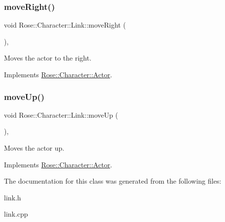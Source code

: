 \mbox{\label{classRose_1_1Character_1_1Link_ad93043b13d83e8afb6f33c3c2572b05b}} 
\subsubsection{\texorpdfstring{moveRight()}{moveRight()}}
{\footnotesize\ttfamily void Rose\+::\+Character\+::\+Link\+::move\+Right (\begin{DoxyParamCaption}{ }\end{DoxyParamCaption})\hspace{0.3cm}{\ttfamily [override]}, {\ttfamily [virtual]}}



Moves the actor to the right. 



Implements \mbox{\hyperlink{classRose_1_1Character_1_1Actor_a89ce0e5d1d6d25b1612867b982221dc9}{Rose\+::\+Character\+::\+Actor}}.

\mbox{\label{classRose_1_1Character_1_1Link_a74ccaa0d2cf7af5b1980378d0cb14b22}} 
\subsubsection{\texorpdfstring{moveUp()}{moveUp()}}
{\footnotesize\ttfamily void Rose\+::\+Character\+::\+Link\+::move\+Up (\begin{DoxyParamCaption}{ }\end{DoxyParamCaption})\hspace{0.3cm}{\ttfamily [override]}, {\ttfamily [virtual]}}



Moves the actor up. 



Implements \mbox{\hyperlink{classRose_1_1Character_1_1Actor_afd7130be2654a3fa94122cf532de4b79}{Rose\+::\+Character\+::\+Actor}}.



The documentation for this class was generated from the following files\+:\begin{DoxyCompactItemize}
\item 
link.\+h\item 
link.\+cpp\end{DoxyCompactItemize}

